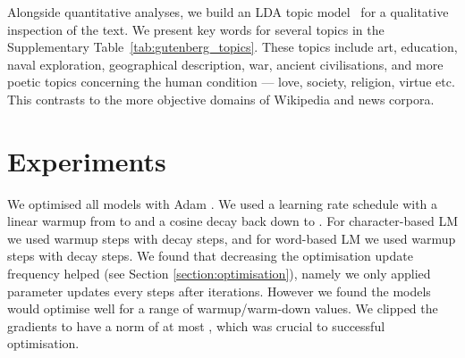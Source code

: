 \documentclass{article} \usepackage{iclr2020_conference,times}
\begin{document}
Alongside quantitative analyses, we build an LDA topic model~\citep{blei2003latent} for a qualitative inspection of the text. We present key words for several topics in the Supplementary Table~\ref{tab:gutenberg_topics}. These topics include art, education, naval exploration, geographical description, war, ancient civilisations, and more poetic topics concerning the human condition --- love, society, religion, virtue etc. This contrasts to the more objective domains of Wikipedia and news corpora. 
\section{Experiments}
We optimised all models with Adam \citep{kingma2014adam}. We used a learning rate schedule with a linear warmup from  to  and a cosine decay back down to . For character-based LM we used  warmup steps with  decay steps, and for word-based LM we used  warmup steps with  decay steps. We found that decreasing the optimisation update frequency helped (see Section \ref{section:optimisation}), namely we only applied parameter updates every  steps after  iterations. However we found the models would optimise well for a range of warmup/warm-down values. We clipped the gradients to have a norm of at most , which was crucial to successful optimisation. 
\vspace{-0.5em}
\end{document}
